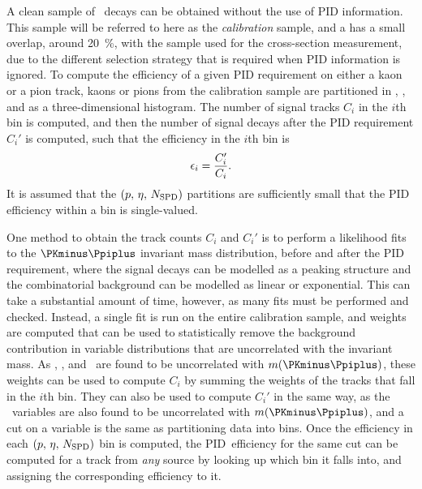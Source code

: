 A clean sample of \DzToKpi\ decays can be obtained without the use of \ac{PID} 
information.
This sample will be referred to here as the \emph{calibration} sample, and a 
has a small overlap, around \SI{20}{\percent}, with the sample used for the 
cross-section measurement, due to the different selection strategy that is 
required when \ac{PID} information is ignored.
To compute the efficiency of a given \ac{PID} requirement on either a kaon or a 
pion track, kaons or pions from the calibration sample are partitioned in 
\ptot, \Eta, and \nspd as a three-dimensional histogram.
The number of signal tracks $C_{i}$ in the $i$th bin is computed, and then the 
number of signal decays after the \ac{PID} requirement $C_{i}'$ is computed, 
such that the efficiency in the $i$th bin is
\begin{equation}
  \epsilon_{i} = \frac{C_{i}'}{C_{i}}.
\end{equation}
It is assumed that the $(p,\,\eta,\,N_{\textnormal{SPD}})$ partitions are sufficiently 
small that the \ac{PID} efficiency within a bin is single-valued.

One method to obtain the track counts $C_{i}$ and $C_{i}'$ is to perform a 
likelihood fits to the $\PKminus\Ppiplus$ invariant mass distribution, before 
and after the \ac{PID} requirement, where the signal \PDzero decays can be 
modelled as a peaking structure and the combinatorial background can be 
modelled as linear or exponential.
This can take a substantial amount of time, however, as many fits must be 
performed and checked.
Instead, a single fit is run on the entire calibration sample, and weights are 
computed that can be used to statistically remove the background contribution 
in variable distributions that are uncorrelated with the invariant 
mass.\footnotemark
As \ptot, \Eta, and \nspd\ are found to be uncorrelated with 
$m(\PKminus\Ppiplus)$, these weights can be used to compute $C_{i}$ by summing 
the weights of the tracks that fall in the $i$th bin.
They can also be used to compute $C_{i}'$ in the same way, as the \dll\ 
variables are also found to be uncorrelated with $m(\PKminus\Ppiplus)$, and a 
cut on a variable is the same as partitioning data into bins.
Once the efficiency in each $(p,\,\eta,\,N_{\textnormal{SPD}})$ bin is computed, the 
\ac{PID}\ efficiency for the same cut can be computed for a track from 
\emph{any} source by looking up which bin it falls into, and assigning the 
corresponding efficiency to it.


